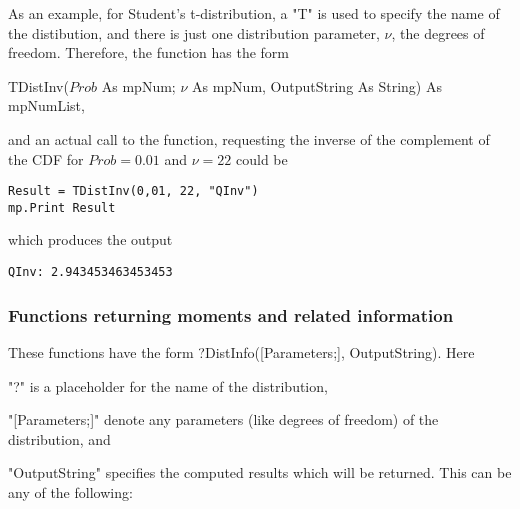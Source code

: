 \vspace{0.3cm}
As an example, for Student's t-distribution, a "T" is used to specify the name of the distibution, and there is just one distribution parameter, $\nu$, the degrees of freedom. Therefore,  the function has the form

\vspace{0.3cm}
\textsf{TDistInv($Prob$ As mpNum; $\nu$ As mpNum, OutputString As String) As mpNumList}, 

\vspace{0.3cm}
and an actual call to the function, requesting the inverse of the complement of the CDF for $Prob=0.01$ and $\nu=22$ could be

\begin{lstlisting}
Result = TDistInv(0,01, 22, "QInv")
mp.Print Result
\end{lstlisting}
which produces the output

\begin{verbatim}
QInv: 2.943453463453453
\end{verbatim}


\newpage
\subsubsection{Functions returning moments and related information}
\label{Functions returning moments and related information}
These functions have the form \textsf{?DistInfo([Parameters;], OutputString)}.
Here 

"?" is a placeholder for the name of the distribution, 

"[Parameters;]" denote any parameters (like degrees of freedom) of the distribution, and 

"OutputString" specifies the computed results which will be returned. This can be any of the following:

